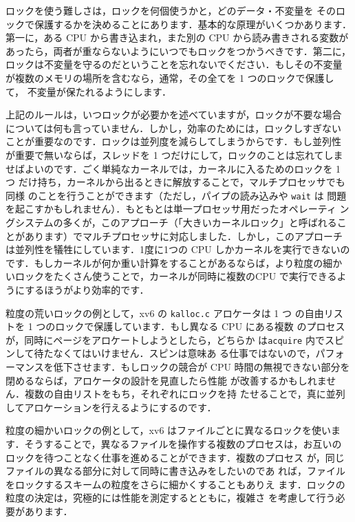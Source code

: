 ロックを使う難しさは，ロックを何個使うかと，どのデータ・不変量を
そのロックで保護するかを決めることにあります．基本的な原理がいくつかあります．
第一に，ある CPU から書き込まれ，また別の CPU から読み書きされる変数が
あったら，両者が重ならないようにいつでもロックをつかうべきです．第二に，
ロックは不変量を守るのだということを忘れないでください．もしその不変量
が複数のメモリの場所を含むなら，通常，その全てを 1 つのロックで保護して，
不変量が保たれるようにします．

上記のルールは，いつロックが必要かを述べていますが，ロックが不要な場合
については何も言っていません．しかし，効率のためには，ロックしすぎない
ことが重要なのです．ロックは並列度を減らしてしまうからです．もし並列性
が重要で無いならば，スレッドを 1 つだけにして，ロックのことは忘れてしま
せばよいのです．ごく単純なカーネルでは，カーネルに入るためのロックを 1 つ
だけ持ち，カーネルから出るときに解放することで，マルチプロセッサでも同様
のことを行うことができます（ただし，パイプの読み込みや \lstinline{wait} は
問題を起こすかもしれません）．もともとは単一プロセッサ用だったオペレーティ
ングシステムの多くが，このアプローチ（「大きいカーネルロック」と呼ばれるこ
とがあります）でマルチプロセッサに対応しました．しかし，このアプローチ
は並列性を犠牲にしています．1度に1つの CPU しかカーネルを実行できないの
です．もしカーネルが何か重い計算をすることがあるならば，より粒度の細か
いロックをたくさん使うことで，カーネルが同時に複数のCPU で実行できるよ
うにするほうがより効率的です．

粒度の荒いロックの例として，xv6 の \lstinline{kalloc.c} アロケータは 1 つ
の自由リストを 1 つのロックで保護しています．もし異なる CPU にある複数
のプロセスが，同時にページをアロケートしようとしたら，どちらか
は\texttt{acquire} 内でスピンして待たなくてはいけません．スピンは意味あ
る仕事ではないので，パフォーマンスを低下させます．もしロックの競合が CPU
時間の無視できない部分を閉めるならば，アロケータの設計を見直したら性能
が改善するかもしれません．複数の自由リストをもち，それぞれにロックを持
たせることで，真に並列してアロケーションを行えるようにするのです．

粒度の細かいロックの例として，xv6 はファイルごとに異なるロックを使いま
す．そうすることで，異なるファイルを操作する複数のプロセスは，お互いの
ロックを待つことなく仕事を進めることができます．複数のプロセス
が，同じファイルの異なる部分に対して同時に書き込みをしたいのであ
れば，ファイルをロックするスキームの粒度をさらに細かくすることもありえ
ます．ロックの粒度の決定は，究極的には性能を測定するとともに，複雑さ
を考慮して行う必要があります．

